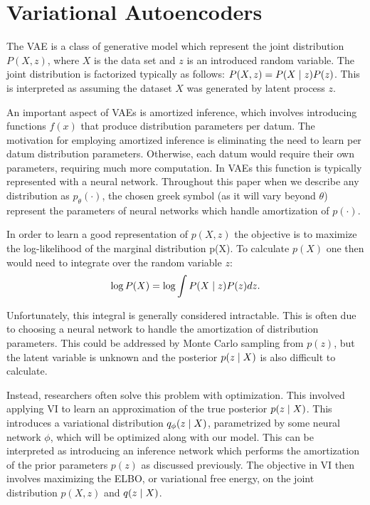\section{Variational Autoencoders}

The \ac{VAE} is a class of generative model which represent the joint distribution $P(X, z)$, where $X$ is the data set and $z$ is an introduced random variable. The joint distribution is factorized typically as follows: $P(X, z) = P(X\; | \;{z})P(z)$. This is interpreted as assuming the dataset $X$ was generated by latent process  $z$. 

An important aspect of \ac{VAE}s is amortized inference, which involves introducing functions $f(x)$ that produce distribution parameters per datum. The motivation for employing amortized inference is eliminating the need to learn per datum distribution parameters. Otherwise, each datum would require their own parameters, requiring much more computation. In \ac{VAE}s this function is typically represented with a neural network. Throughout this paper when we describe any distribution as $p_{\theta}(\cdot)$, the chosen greek symbol (as it will vary beyond $\theta$) represent the parameters of neural networks which handle amortization of $p(\cdot)$. 

In order to learn a good representation of $p(X,z)$ the objective is to maximize the log-likelihood of the marginal distribution p(X). To calculate $p(X)$ one then would need to integrate over the random variable $z$:
\begin{equation}
\log P(X) = \log \int P(X \; | \;{z}) P(z) dz.
\end{equation}

Unfortunately, this integral is generally considered intractable. This is often due to choosing a neural network to handle the amortization of distribution parameters. This could be addressed by Monte Carlo sampling from $p(z)$, but the latent variable is unknown and the posterior $p(z \; | \;{X})$ is also difficult to calculate. 

Instead, researchers often solve this problem with optimization. This involved applying \ac{VI} to learn an approximation of the true posterior $p(z \; | \;{X})$. This introduces a variational distribution $q_{\phi}(z \; | \;{X})$, parametrized by some neural network $\phi$, which will be optimized along with our model. This can be interpreted as introducing an inference network which performs the amortization of the prior parameters $p(z)$ as discussed previously. The objective in \ac{VI} then involves maximizing the \ac{ELBO}, or variational free energy, on the joint distribution $p(X, z)$ and $q(z \; | \;{X})$. 

